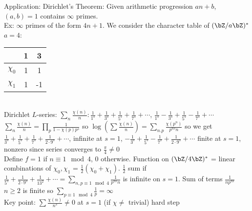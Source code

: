 \noindent
Application: Dirichlet's Theorem: Given arithmetic progression $an+b$, $(a,b)=1$ contains $\infty$ primes. \\
Ex: $\infty$ primes of the form $4n+1$. We consider the character table of $(\bZ/a\bZ)^*$ \\
$a = 4$: \begin{tabular}{| c c c |} & 1 & 3 \\ \hline  $\chi_0$ & 1 & 1 \\ $\chi_1$ & 1 & -1  \end{tabular} \\
Dirichlet $L$-series: $\sum_{n} \frac{\chi(n)}{n}: \frac{1}{1^s} + \frac{1}{3^s} + \frac{1}{5^s} + \frac{1}{7^s} + \cdots$, $\frac{1}{1^s} - \frac{1}{3^s} + \frac{1}{5^s} - \frac{1}{7^s} + \cdots$ \\ 
$\sum_{n} \frac{\chi(n)}{n} = \prod_p \frac{1}{1 - \chi(p)p^s}$ so $\log \left( \sum \frac{\chi(n)}{n} \right) = \sum_{n.p} \frac{\chi(p^n)}{p^{ns}n}$ so we get  $ \frac{1}{3^s} + \frac{1}{5^s} + \frac{1}{7^s} + \frac{1}{2 \cdot 9^s}+ \cdots$, infinite at $s=1$, $ - \frac{1}{3^s} + \frac{1}{5^s} - \frac{1}{7^s} + \frac{1}{2 \cdot 9^s} + \cdots$ finite at $s=1$, nonzero since series converges to $\frac{\pi}{4} \neq 0$ \\ 
Define $f=1$ if $n \equiv 1 \mod 4$, 0 otherwise. Function on $(\bZ/4\bZ)^*$ = linear combinations of $\chi_0, \chi_1$ = $\frac{1}{2}(\chi_0 + \chi_1)$. $\frac{1}{2}$ sum if $\frac{1}{5^s} + \frac{1}{2 \cdot 9^s} + \frac{1}{13^2} + \cdots = \sum_{n,p \equiv 1 \mod 4} \frac{1}{p^{ns}n}$ is infinite on $s=1$. Sum of terms $\frac{1}{np^{ns}}$ $n \ge 2$ is finite so $\sum_{p \equiv 1 \mod 4} \frac{1}{p} = \infty$ \\
Key point: $\sum \frac{\chi(n)}{n^s} \neq 0$ at $s=1$ (if $\chi \neq $ trivial) \quad hard step 
